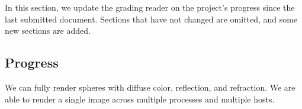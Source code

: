 In this section, we update the grading reader on the project's progress since
the last submitted document. Sections that have not changed are omitted, and
some new sections are added.

\subsection{Progress}

We can fully render spheres with diffuse color, reflection, and refraction. We
are able to render a single image across multiple processes and multiple hosts.

